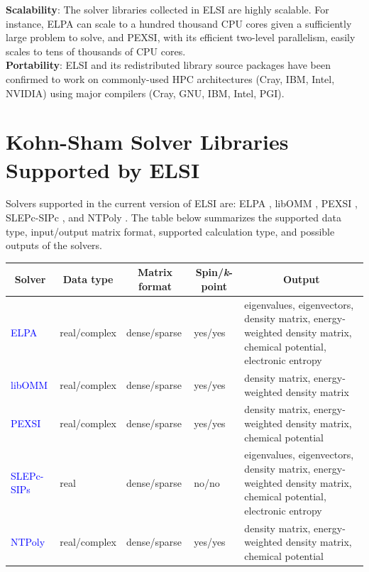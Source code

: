 \documentclass{report}
\begin{document}
\textbf{Scalability}:  The solver libraries collected in ELSI are highly scalable.  For instance, ELPA can scale to a hundred thousand CPU cores given a sufficiently large problem to solve, and PEXSI, with its efficient two-level parallelism, easily scales to tens of thousands of CPU cores.\\

\textbf{Portability}:  ELSI and its redistributed library source packages have been confirmed to work on commonly-used HPC architectures (Cray, IBM, Intel, NVIDIA) using major compilers (Cray, GNU, IBM, Intel, PGI).\\

\section{Kohn-Sham Solver Libraries Supported by ELSI}
\label{sec:solvers}
Solvers supported in the current version of ELSI are:  ELPA \cite{elpa_auckenthaler_2011,elpa_marek_2014}, libOMM \cite{libomm_corsetti_2014}, PEXSI \cite{pexsi_lin_2009,pexsi_lin_2013}, SLEPc-SIPc \cite{slepc_hernandez_2005,sips_keceli_2016}, and NTPoly \cite{ntpoly_dawson_2018}.  The table below summarizes the supported data type, input/output matrix format, supported calculation type, and possible outputs of the solvers.\\

\begin{tabular}[]{|p{20mm}|p{25mm}|p{25mm}|p{25mm}|p{70mm}|}
\hline
\multicolumn{1}{|c|}{\textbf{Solver}} & \multicolumn{1}{c|}{\textbf{Data type}} & \multicolumn{1}{c|}{\textbf{Matrix format}} & \multicolumn{1}{c|}{\textbf{Spin/\textit{k}-point}} & \multicolumn{1}{c|}{\textbf{Output}}\\
\hline
\textcolor{blue}{ELPA}       & real/complex & dense/sparse & yes/yes & eigenvalues, eigenvectors, density matrix, energy-weighted density matrix, chemical potential, electronic entropy\\
\hline
\textcolor{blue}{libOMM}     & real/complex & dense/sparse & yes/yes & density matrix, energy-weighted density matrix\\
\hline
\textcolor{blue}{PEXSI}      & real/complex & dense/sparse & yes/yes & density matrix, energy-weighted density matrix, chemical potential\\
\hline
\textcolor{blue}{SLEPc-SIPs} & real         & dense/sparse & no/no   & eigenvalues, eigenvectors, density matrix, energy-weighted density matrix, chemical potential, electronic entropy\\
\hline
\textcolor{blue}{NTPoly}     & real/complex & dense/sparse & yes/yes & density matrix, energy-weighted density matrix, chemical potential\\
\hline
\end{tabular}
\end{document}
